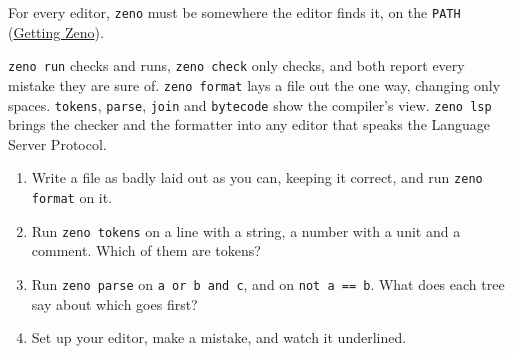 For every editor, \verb|zeno| must be somewhere the editor finds it,
on the \verb|PATH| (\hyperref[ch-getting-zeno]{Getting Zeno}).

\begin{summary}
\verb|zeno run| checks and runs, \verb|zeno check| only checks, and
both report every mistake they are sure of. \verb|zeno format| lays a
file out the one way, changing only spaces. \verb|tokens|,
\verb|parse|, \verb|join| and \verb|bytecode| show the compiler's view.
\verb|zeno lsp| brings the checker and the formatter into any editor
that speaks the Language Server Protocol.
\end{summary}

\begin{tryit}
\begin{enumerate}
\item Write a file as badly laid out as you can, keeping it correct,
  and run \verb|zeno format| on it.
\item Run \verb|zeno tokens| on a line with a string, a number with a
  unit and a comment. Which of them are tokens?
\item Run \verb|zeno parse| on \verb|a or b and c|, and on
  \verb|not a == b|. What does each tree say about which goes first?
\item Set up your editor, make a mistake, and watch it underlined.
\end{enumerate}
\end{tryit}
